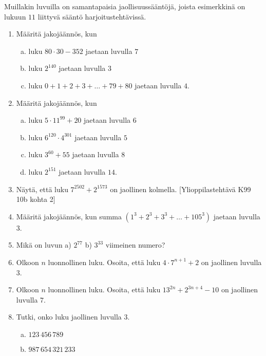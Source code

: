 Muillakin luvuilla on samantapaisia jaollisuussääntöjä, joista esimerkkinä on lukuun $11$ liittyvä sääntö harjoitustehtävissä.




\Harjoitustehtavat

\begin{enumerate}

\item Määritä jakojäännös, kun
\begin{enumerate}[a)]
\item luku $80 \cdot 30 - 352$ jaetaan luvulla $7$
\item luku $2^{140}$ jaetaan luvulla $3$
\item luku $0+1+2+3+ \ldots + 79 + 80$ jaetaan luvulla $4$.
\end{enumerate}

\item Määritä jakojäännös, kun
\begin{enumerate}[a)]
\item luku $5 \cdot 11^{99} + 20$ jaetaan luvulla $6$
\item luku $6^{120} \cdot 4^{301}$ jaetaan luvulla $5$
\item luku $3^{60} + 55$ jaetaan luvulla $8$
\item luku $2^{151}$ jaetaan luvulla $14$.
\end{enumerate}

\item
Näytä, että luku $7^{2502} + 2^{1573}$ on jaollinen kolmella. [Ylioppilastehtävä K99 10b kohta 2]

\item Määritä jakojäännös, kun summa $(1^3 + 2^3 + 3^3 + \ldots + 105^3)$ jaetaan luvulla $3$.

\item Mikä on luvun a) $2^{77}$ b) $3^{33}$ viimeinen numero?

\item Olkoon $n$ luonnollinen luku. Osoita, että luku $4\cdot 7^{n+1}+2$ on jaollinen luvulla $3$.

\item Olkoon $n$ luonnollinen luku. Osoita, että luku $13^{2n} + 2^{3n+4} - 10$ on jaollinen luvulla $7$.

\item
Tutki, onko luku jaollinen luvulla $3$.
\begin{enumerate}[a)]
\item $123\, 456\, 789$
\item $987\, 654\, 321\, 233$
\end{enumerate}


\end{enumerate}
